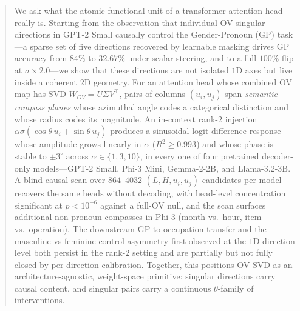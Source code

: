 \begin{abstract}
We ask what the atomic functional unit of a transformer attention
head really is. Starting from the observation that individual OV
singular directions in GPT-2 Small causally control the
Gender-Pronoun (GP) task---a sparse set of five directions
recovered by learnable masking drives GP accuracy from $84\%$ to
$32.67\%$ under scalar steering, and to a full $100\%$ flip at
$\sigma\!\times\!2.0$---we show that these directions are not
isolated $1$D axes but live inside a coherent $2$D geometry. For an
attention head whose combined OV map has SVD
$W_{OV} = U\Sigma V^{\top}$, pairs of columns $(u_i, u_j)$ span
\emph{semantic compass planes} whose azimuthal angle codes a
categorical distinction and whose radius codes its magnitude. An
in-context rank-$2$ injection
$\alpha\sigma(\cos\theta\,u_i + \sin\theta\,u_j)$ produces a
sinusoidal logit-difference response whose amplitude grows linearly
in $\alpha$ ($R^2 \ge 0.993$) and whose phase is stable to
$\pm 3^\circ$ across $\alpha \in \{1,3,10\}$, in every one of four
pretrained decoder-only models---GPT-2 Small, Phi-3 Mini,
Gemma-2-2B, and Llama-3.2-3B. A blind causal scan over
$864$--$4032$ $(L,H,u_i,u_j)$ candidates per model recovers the
same heads without decoding, with head-level concentration
significant at $p < 10^{-6}$ against a full-OV null, and the scan
surfaces additional non-pronoun compasses in Phi-3 (month vs.\ hour,
item vs.\ operation). The downstream GP-to-occupation transfer and
the masculine-vs-feminine control asymmetry first observed at the
$1$D direction level both persist in the rank-$2$ setting and are
partially but not fully closed by per-direction calibration.
Together, this positions OV-SVD as an architecture-agnostic,
weight-space primitive: singular directions carry causal content,
and singular pairs carry a continuous $\theta$-family of
interventions.
\end{abstract}
